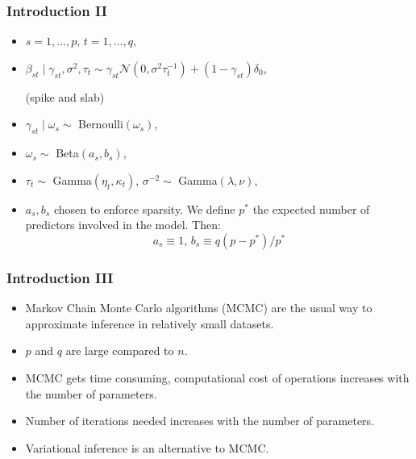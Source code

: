 \documentclass{beamer}
\begin{document}
\begin{frame}
\frametitle{Introduction II}
\begin{itemize}
\item $s = 1,\ldots,p$, $t=1,\ldots,q$,
\item $\beta_{st}\mid\gamma_{st},\sigma^2,\tau_t \sim \gamma_{st}\mathcal{N}(0,\sigma^2\tau_t^{-1})+(1-\gamma_{st})\delta_0$,

(spike and slab)

\item $\gamma_{st} \mid \omega_{s} \sim $ Bernoulli$(\omega_s)$,

\item $\omega_s \sim $ Beta$(a_s,b_s)$,
\item $\tau_t \sim $ Gamma$(\eta_t,\kappa_t)$, $\sigma^{-2} \sim $ Gamma$(\lambda,\nu)$,
\item $a_s, b_s$ chosen to enforce sparsity. We define $p^*$ the expected number of predictors involved in the model. Then:
$$
a_s \equiv 1\text{, }b_s \equiv q(p-p^*)/p^*
$$

\end{itemize}

\end{frame}

\begin{frame}
\frametitle{Introduction III}
\begin{itemize}
\item Markov Chain Monte Carlo algorithms (MCMC) are the usual way to approximate inference in relatively small datasets.
\item $p$ and $q$ are large compared to $n$.
\item MCMC gets time consuming, computational cost of operations increases with the number of parameters.
\item Number of iterations needed increases with the number of parameters.
\item Variational inference is an alternative to MCMC. 
\end{itemize}
\end{frame}
\end{document}
